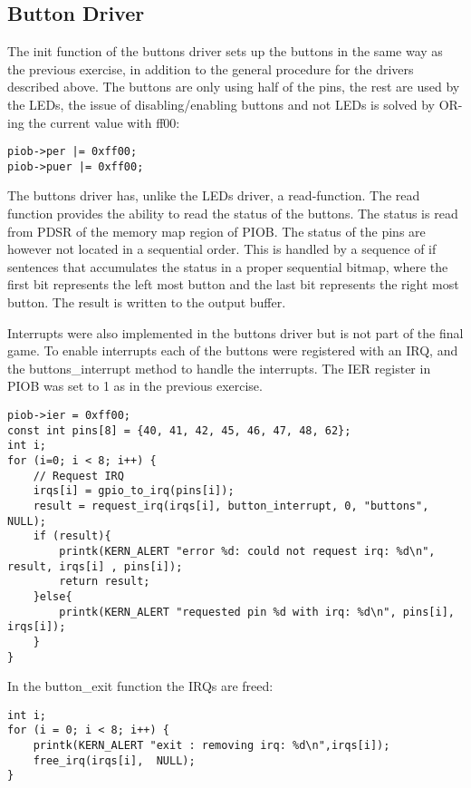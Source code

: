 \subsection{Button Driver}
The init function of the buttons driver sets up the buttons in the same way as the previous exercise, in addition to the general procedure for the drivers described above. The buttons are only using half of the pins, the rest are used by the LEDs, the issue of disabling/enabling buttons and not LEDs is solved by OR-ing the current value with ff00:
\begin{lstlisting}
piob->per |= 0xff00;
piob->puer |= 0xff00;
\end{lstlisting}

The buttons driver has, unlike the LEDs driver, a read-function. The read function provides the ability to read the status of the buttons. The status is read from PDSR of the memory map region of PIOB. The status of the pins are however not located in a sequential order. This is handled by a sequence of if sentences that accumulates the status in a proper sequential bitmap, where the first bit represents the left most button and the last bit represents the right most button. The result is written to the output buffer.

Interrupts were also implemented in the buttons driver but is not part of the final game. To enable interrupts each of the buttons were registered with an IRQ, and the buttons\_interrupt method to handle the interrupts. The IER register in PIOB was set to 1 as in the previous exercise.
\begin{lstlisting}
piob->ier = 0xff00;
const int pins[8] = {40, 41, 42, 45, 46, 47, 48, 62};
int i;
for (i=0; i < 8; i++) {
	// Request IRQ
	irqs[i] = gpio_to_irq(pins[i]);
	result = request_irq(irqs[i], button_interrupt, 0, "buttons", NULL);
	if (result){
		printk(KERN_ALERT "error %d: could not request irq: %d\n", result, irqs[i] , pins[i]);
		return result;
	}else{
		printk(KERN_ALERT "requested pin %d with irq: %d\n", pins[i], irqs[i]);
	}
}
\end{lstlisting}

In the button\_exit function the IRQs are freed:
\begin{lstlisting}
int i;
for (i = 0; i < 8; i++) {
	printk(KERN_ALERT "exit : removing irq: %d\n",irqs[i]);
	free_irq(irqs[i],  NULL);
}
\end{lstlisting}

